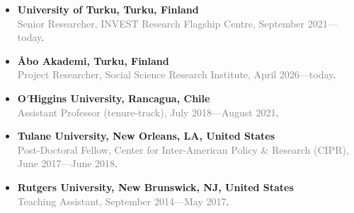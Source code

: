 \begin{itemize}
  \item[\textcolor{gray}{\textbullet}] {\bf University of Turku, Turku, Finland}\\
  \textcolor{gray}{Senior Researcher, INVEST Research Flagship Centre, September 2021---today}.

    \item[\textcolor{gray}{\textbullet}] {\bf Åbo Akademi, Turku, Finland}\\
  \textcolor{gray}{Project Researcher, Social Science Research Institute, April 2026---today}.


  \item[\textcolor{gray}{\textbullet}] {\bf O$'$Higgins University, Rancagua, Chile}\\
  \textcolor{gray}{Assistant Professor (tenure-track), July 2018---August 2021}.

  \item[\textcolor{gray}{\textbullet}] {\bf Tulane University, New Orleans, LA, United States}\\
  \textcolor{gray}{Post-Doctoral Fellow, Center for Inter-American Policy \& Research (CIPR), June 2017---June 2018}.

  \item[\textcolor{gray}{\textbullet}] {\bf Rutgers University, New Brunswick, NJ, United States}\\
 \textcolor{gray}{Teaching Assistant, September 2014---May 2017}.
\end{itemize}
